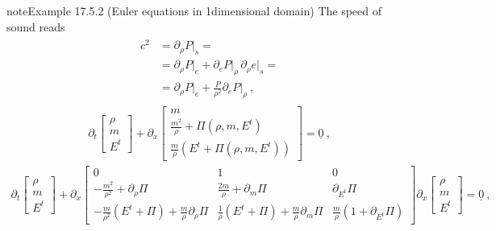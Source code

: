 \documentclass[letterpaper,10pt,english]{jupyterBook}
\begin{document}
\begin{sphinxadmonition}{note}{Example 17.5.2 (Euler equations in 1\sphinxhyphen{}dimensional domain)}
\sphinxAtStartPar
The speed of sound reads
\begin{equation*}
\begin{split}\begin{aligned}
  c^2
  & = \partial_\rho P\big|_s = \\
  & = \partial_\rho P\big|_e + \partial_e P\big|_{\rho} \, \partial_\rho e\big|_s = \\
  & = \partial_\rho P\big|_e + \frac{P}{\rho^2} \partial_e P \big|_{\rho} \ ,
\end{aligned}\end{split}
\end{equation*}
\sphinxAtStartPar
{}
\begin{equation*}
\begin{split}\partial_t \begin{bmatrix} \rho \\ m \\ E^t \end{bmatrix} + \partial_x \begin{bmatrix} m \\ \frac{m^2}{\rho} + \Pi(\rho,m,E^t) \\ \frac{m}{\rho} \left(E^t + \Pi(\rho, m, E^t)\right)  \end{bmatrix} = \underline{0} \ ,\end{split}
\end{equation*}
\sphinxAtStartPar
{}
\begin{equation*}
\begin{split}\partial_t \begin{bmatrix} \rho \\ m \\ E^t \end{bmatrix} + \partial_x \begin{bmatrix} 0 & 1 & 0 \\ - \frac{m^2}{\rho^2} + \partial_\rho \Pi & \frac{2 m}{\rho} + \partial_m \Pi & \partial_{E^t} \Pi \\ - \frac{m}{\rho^2}(E^t+\Pi)+ \frac{m}{\rho}\partial_\rho \Pi & \frac{1}{\rho} (E^t + \Pi) + \frac{m}{ \rho} \partial_{m} \Pi & \frac{m}{\rho} \left( 1 + \partial_{E^t} \Pi \right)  \end{bmatrix} \partial_x \begin{bmatrix} \rho \\ m \\ E^t \end{bmatrix}  = \underline{0} \ ,\end{split}

\end{equation*}
\end{sphinxadmonition}
\end{document}
